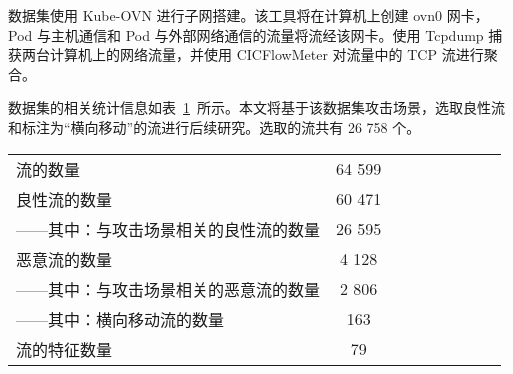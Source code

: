 {数据集使用 Kube-OVN 进行子网搭建。该工具将在计算机上创建 ovn0 网卡，Pod 与主机通信和 Pod 与外部网络通信的流量将流经该网卡。使用 Tcpdump 捕获两台计算机上的网络流量，并使用 CICFlowMeter\citep{engelen2021troubleshooting} 对流量中的 TCP 流进行聚合。%

数据集的相关统计信息如表~\ref{tab:dataset-metadata}~所示。本文将基于该数据集攻击场景，选取良性流和标注为``横向移动''的流进行后续研究。选取的流共有 26 758 个。



\begin{table}[t]
    \label{tab:dataset-metadata}
    \centering
    \footnotesize%
    \setlength{\tabcolsep}{4pt}%
    \renewcommand{\arraystretch}{1.2}%
    \begin{tabular}{lcccccccc}
        \hline
        流的数量 & 64 599\\
        良性流的数量 & 60 471\\
        ——其中：与攻击场景相关的良性流的数量 & 26 595\\
        恶意流的数量 & 4 128\\
        ——其中：与攻击场景相关的恶意流的数量 & 2 806\\
        ——其中：横向移动流的数量 & 163\\
        流的特征数量 & 79\\
        \hline
    \end{tabular}
\end{table}

}